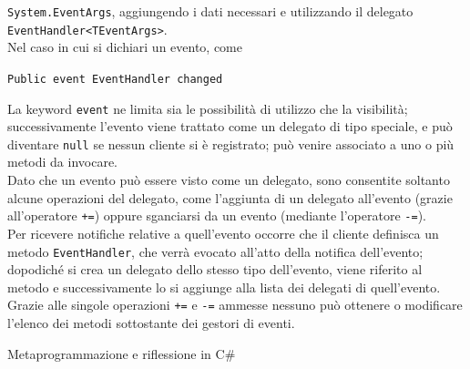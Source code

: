 \begin{solution}
\texttt{System.EventArgs}, aggiungendo i dati necessari e utilizzando il delegato \texttt{EventHandler<TEventArgs>}.
\\
Nel caso in cui si dichiari un evento, come
\begin{center}
	\texttt{Public event EventHandler changed}
\end{center}
La keyword \texttt{event} ne limita sia le possibilità di utilizzo che la visibilità; successivamente l’evento viene trattato come
un delegato di tipo speciale, e può diventare \texttt{null} se nessun cliente si è registrato; può venire associato a uno o più
metodi da invocare.
\\
Dato che un evento può essere visto come un delegato, sono consentite soltanto alcune operazioni del delegato,
come l’aggiunta di un delegato all’evento (grazie all’operatore \texttt{+=}) oppure sganciarsi da un evento (mediante
l’operatore \texttt{-=}).
\\
Per ricevere notifiche relative a quell’evento occorre che il cliente definisca un metodo \texttt{EventHandler}, che verrà
evocato all’atto della notifica dell’evento; dopodiché si crea un delegato dello stesso tipo dell’evento, viene riferito al
metodo e successivamente lo si aggiunge alla lista dei delegati di quell’evento.
\\Grazie alle singole operazioni \texttt{+=} e \texttt{-=} ammesse nessuno può ottenere o modificare l’elenco dei metodi sottostante dei
gestori di eventi.

\end{solution}
\begin{problem}{1.9}
Metaprogrammazione e riflessione in C\#
\end{problem}
